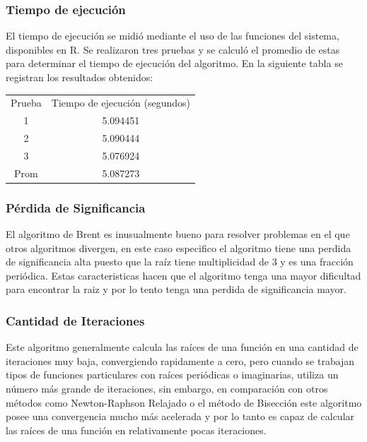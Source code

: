 \documentclass[a4paper,12pt]{article}
\begin{document}
\subsubsection{Tiempo de ejecución}

El tiempo de ejecución se midió mediante el uso de las funciones del sistema, disponibles en R. Se realizaron tres pruebas y se calculó el promedio de estas para determinar el tiempo de ejecución del algoritmo.  En la siguiente tabla se registran los resultados obtenidos: \par 

\begin{table}[ht!]
\begin{tabular}{cc}
Prueba & Tiempo de ejecución (segundos) \\
1      & 5.094451                       \\
2      & 5.090444                       \\
3      & 5.076924                       \\
Prom   & 5.087273                      
\end{tabular}
\end{table}
\vspace{-1em}

\subsubsection{Pérdida de Significancia}

El algoritmo de Brent es inusualmente bueno para resolver problemas en el que otros algoritmos divergen, en este caso especifico el algoritmo tiene una perdida de significancia alta puesto que  la raíz tiene multiplicidad de 3 y es una fracción periódica. Estas caracteristicas hacen que el algoritmo tenga una mayor dificultad para encontrar la raiz y por lo tento tenga una perdida de significancia mayor.\par 

\subsubsection{Cantidad de Iteraciones}

Este algoritmo generalmente calcula las raíces de una función en una cantidad de iteraciones muy baja, convergiendo rapidamente a cero, pero cuando se trabajan tipos de funciones particulares con raíces periódicas o imaginarias, utiliza un número más grande de iteraciones, sin embargo, en comparación con otros métodos como Newton-Raphson Relajado o el método de Bisección este algoritmo posee una convergencia mucho más acelerada y por lo tanto es capaz de calcular las raíces de una función en relativamente pocas iteraciones. \par 
\end{document}

